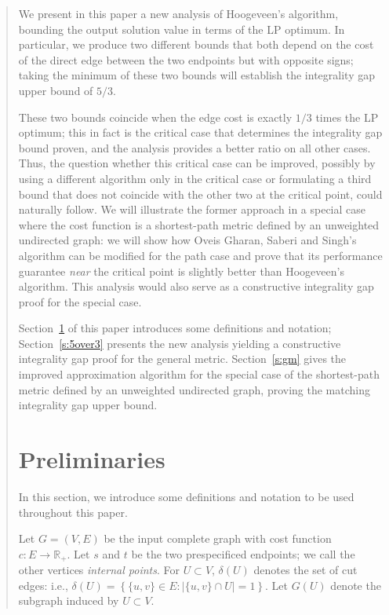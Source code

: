 \documentclass[11pt,letterpaper]{article}
\begin{document}
\begin{quote}
We present in this paper a new analysis of Hoogeveen's algorithm, bounding the output solution value in terms of the LP optimum. In particular, we produce two different bounds that both depend on the cost of the direct edge between the two endpoints but with opposite signs; taking the minimum of these two bounds will establish the integrality gap upper bound of $5/3$.

These two bounds coincide when the edge cost is exactly $1/3$ times the LP optimum; this in fact is the critical case that determines the integrality gap bound proven, and the analysis provides a better ratio on all other cases. Thus, the question whether this critical case can be improved, possibly by using a different algorithm only in the critical case or formulating a third bound that does not coincide with the other two at the critical point, could naturally follow. We will illustrate the former approach in a special case where the cost function is a shortest-path metric defined by an unweighted undirected graph: we will show how Oveis Gharan, Saberi and Singh's algorithm can be modified for the path case and prove that its performance guarantee \emph{near} the critical point is slightly better than Hoogeveen's algorithm. This analysis would also serve as a constructive integrality gap proof for the special case.

Section~\ref{s:pre} of this paper introduces some definitions and notation; Section~\ref{s:5over3} presents the new analysis yielding a constructive integrality gap proof for the general metric. Section~\ref{s:gm} gives the improved approximation algorithm for the special case of the shortest-path metric defined by an unweighted undirected graph, proving the matching integrality gap upper bound.

\section{Preliminaries}\label{s:pre}

In this section, we introduce some definitions and notation to be used throughout this paper.

Let $G=(V,E)$ be the input complete graph with cost function $c:E\to\mathbb{R}_+$. Let $s$ and $t$ be the two prespecificed endpoints; we call the other vertices \emph{internal points}. For $U\subset V$, $\delta(U)$ denotes the set of cut edges: i.e., $\delta(U)=\left\{\{u,v\}\in E : |\{u,v\}\cap U|=1\right\}$. Let $G(U)$ denote the subgraph induced by $U\subset V$.


\end{quote}
\end{document}

